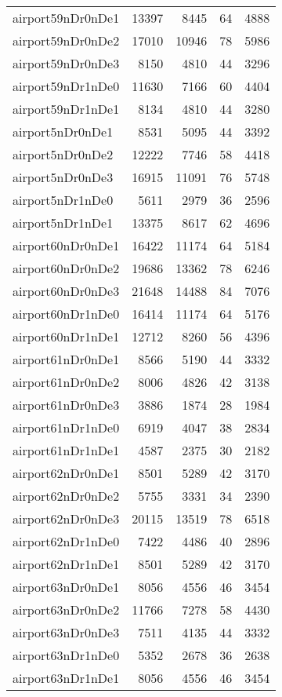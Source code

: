 \begin{longtable}{lrrrr}
airport59nDr0nDe1 & 13397 & 8445 & 64 & 4888 \\
airport59nDr0nDe2 & 17010 & 10946 & 78 & 5986 \\
airport59nDr0nDe3 & 8150 & 4810 & 44 & 3296 \\
airport59nDr1nDe0 & 11630 & 7166 & 60 & 4404 \\
airport59nDr1nDe1 & 8134 & 4810 & 44 & 3280 \\
airport5nDr0nDe1 & 8531 & 5095 & 44 & 3392 \\
airport5nDr0nDe2 & 12222 & 7746 & 58 & 4418 \\
airport5nDr0nDe3 & 16915 & 11091 & 76 & 5748 \\
airport5nDr1nDe0 & 5611 & 2979 & 36 & 2596 \\
airport5nDr1nDe1 & 13375 & 8617 & 62 & 4696 \\
airport60nDr0nDe1 & 16422 & 11174 & 64 & 5184 \\
airport60nDr0nDe2 & 19686 & 13362 & 78 & 6246 \\
airport60nDr0nDe3 & 21648 & 14488 & 84 & 7076 \\
airport60nDr1nDe0 & 16414 & 11174 & 64 & 5176 \\
airport60nDr1nDe1 & 12712 & 8260 & 56 & 4396 \\
airport61nDr0nDe1 & 8566 & 5190 & 44 & 3332 \\
airport61nDr0nDe2 & 8006 & 4826 & 42 & 3138 \\
airport61nDr0nDe3 & 3886 & 1874 & 28 & 1984 \\
airport61nDr1nDe0 & 6919 & 4047 & 38 & 2834 \\
airport61nDr1nDe1 & 4587 & 2375 & 30 & 2182 \\
airport62nDr0nDe1 & 8501 & 5289 & 42 & 3170 \\
airport62nDr0nDe2 & 5755 & 3331 & 34 & 2390 \\
airport62nDr0nDe3 & 20115 & 13519 & 78 & 6518 \\
airport62nDr1nDe0 & 7422 & 4486 & 40 & 2896 \\
airport62nDr1nDe1 & 8501 & 5289 & 42 & 3170 \\
airport63nDr0nDe1 & 8056 & 4556 & 46 & 3454 \\
airport63nDr0nDe2 & 11766 & 7278 & 58 & 4430 \\
airport63nDr0nDe3 & 7511 & 4135 & 44 & 3332 \\
airport63nDr1nDe0 & 5352 & 2678 & 36 & 2638 \\
airport63nDr1nDe1 & 8056 & 4556 & 46 & 3454 \\

\end{longtable}
